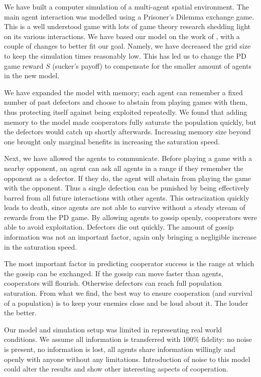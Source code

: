 \documentclass[english]{article}
\begin{document}
We have built a computer simulation of a multi-agent spatial environment.
The main agent interaction was modelled using a Prisoner's Dilemma exchange game. This is a well understood game with lots of game theory research shedding light on its various interactions.
We have based our model on the work of \citet{smaldino}, with a couple of changes to better fit our goal.
Namely, we have decreased the grid size to keep the simulation times reasonably low.
This has led us to change the PD game reward $S$ (sucker's payoff) to compensate for the smaller amount of agents in the new model.

We have expanded the model with memory; each agent can remember a fixed number of past defectors and choose to abstain from playing games with them, thus protecting itself against being exploited repeatedly.
We found that adding memory to the model made cooperators fully saturate the population quickly, but the defectors would catch up shortly afterwards.
Increasing memory size beyond one brought only marginal benefits in increasing the saturation speed.

Next, we have allowed the agents to communicate. Before playing a game with a nearby opponent, an agent can ask all agents in a range if they remember the opponent as a defector. If they do, the agent will abstain from playing the game with the opponent.
Thus a single defection can be punished by being effectively barred from all future interactions with other agents.
This ostracization quickly leads to death, since agents are not able to survive without a steady stream of rewards from the PD game.
By allowing agents to gossip openly, cooperators were able to avoid exploitation. Defectors die out quickly.
The amount of gossip information was not an important factor, again only bringing a negligible increase in the saturation speed.

The most important factor in predicting cooperator success is the range at which the gossip can be exchanged.
If the gossip can move faster than agents, cooperators will flourish.  Otherwise defectors can reach full population saturation.
From what we find, the best way to ensure cooperation (and survival of a population) is to keep your enemies close and be loud about it.
The louder the better.

Our model and simulation setup was limited in representing real world conditions.
We assume all information is transferred with 100\% fidelity: no noise is present, no information is lost, all agents share information willingly and openly with anyone without any limitations. Introduction of noise to this model could alter the results and show other interesting aspects of cooperation.
\end{document}
